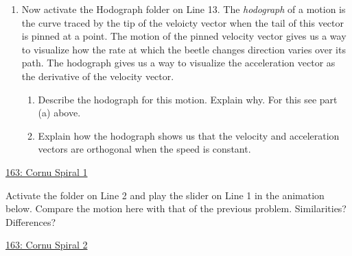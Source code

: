 \documentclass{ximera}
\begin{document}
\begin{question}
\begin{enumerate}
\item Now activate the Hodograph folder on Line 13. The \emph{hodograph} of a motion is the curve traced by the tip of the veloicty vector when the tail of this vector is pinned at a point. The motion of the pinned velocity vector gives us a way to visualize how the rate at which the beetle changes direction varies over its path. The hodograph gives us a way to visualize the acceleration vector as the derivative of the velocity vector.

\begin{enumerate}
\item Describe the hodograph for this motion. Explain why. For this see part (a) above.

\item Explain how the hodograph shows us that the velocity and acceleration vectors are orthogonal when the speed is constant.

\end{enumerate} 


\begin{onlineOnly}
    \begin{center}
\end{center}
\end{onlineOnly}


\end{enumerate}
\href{https://www.desmos.com/3d/aqtl75oi1h}{163: Cornu Spiral 1}

\end{question}



\begin{question}  \label{Q34rr4tr354}
Activate the folder on Line 2 and play the slider on Line 1 in the animation below. Compare the motion here with that of the previous problem. Similarities? Differences?

\begin{onlineOnly}
    \begin{center}
\end{center}
\end{onlineOnly}


\href{https://www.desmos.com/3d/6jqsfb5ols}{163: Cornu Spiral 2}

\end{question}
\end{document}

